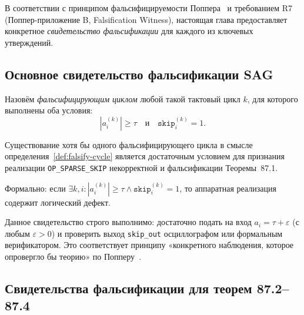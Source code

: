 В соответствии с принципом фальсифицируемости Поппера~\cite{popper1959}
и требованием R7 (Поппер-приложение B, Falsification Witness),
настоящая глава предоставляет конкретное \emph{свидетельство
фальсификации} для каждого из ключевых утверждений.

\subsection{Основное свидетельство фальсификации SAG}
\label{ssec:glava87-falsify-main}

\begin{definition}
\label{def:falsify-cycle}
Назовём \emph{фальсифицирующим циклом} любой такой тактовый цикл
$k$, для которого выполнены оба условия:
\begin{equation}
  |a_i^{(k)}| \geq \tau \quad \text{и} \quad \texttt{skip}^{(k)}_i = 1.
  \label{eq:falsify-condition}
\end{equation}
\end{definition}

\begin{proposition}
\label{prop:falsify}
Существование хотя бы одного фальсифицирующего цикла в смысле
определения~\ref{def:falsify-cycle} является достаточным условием
для признания реализации \texttt{OP\_SPARSE\_SKIP} некорректной
и фальсификации Теоремы~87.1.

Формально: если $\exists k, i : |a_i^{(k)}| \geq \tau \wedge
\texttt{skip}_i^{(k)} = 1$, то аппаратная реализация содержит
логический дефект.
\end{proposition}

\begin{remark}
Данное свидетельство строго выполнимо: достаточно подать на вход
$a_i = \tau + \varepsilon$ (с любым $\varepsilon > 0$) и проверить
выход \texttt{skip\_out} осциллографом или формальным верификатором.
Это соответствует принципу «конкретного наблюдения, которое
опровергло бы теорию» по Попперу~\cite{popper_conjectures}.
\end{remark}

\subsection{Свидетельства фальсификации для теорем 87.2–87.4}
\label{ssec:glava87-falsify-others}

